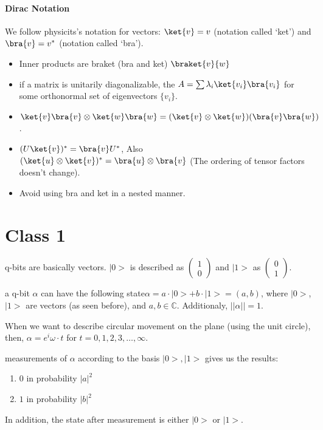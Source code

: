 \paragraph{Dirac Notation}
We follow physicits's notation for vectors: $\ket{v}=v$ (notation called `ket') and $\bra{v} = v^*$ (notation called `bra').

\begin{itemize}
    \item Inner products are braket (bra and ket)  $\braket{v}{w}$
    \item if a matrix is unitarily diagonalizable, the $A=\sum \lambda_i \ket{v_i}\bra{v_i}$ for some orthonormal set of eigenvectors $\{v_i\}$.
    \item $\ket{v}\bra{v}\otimes \ket{w}\bra{w}=(\ket{v}\otimes\ket{w})(\bra{v}\bra{w})$.
    \item $(U\ket{v})^*=\bra{v}U^*$, Also $(\ket{u}\otimes \ket{v})^*=\bra{u}\otimes \bra{v}$ (The ordering of tensor factors doesn't change).
    \item Avoid using bra and ket in a nested manner.
\end{itemize}

\section{Class 1}

q-bits are basically vectors. $|0>$ is described as $\begin{pmatrix} 1 \\ 0 \end{pmatrix}$ and $|1>$ as $\begin{pmatrix} 0 \\ 1 \end{pmatrix}$.

a q-bit $\alpha$ can have the following state$\alpha= a\cdot |0>+b\cdot |1>=(a,b)$, where $|0>$,$|1>$ are vectors (as seen before), and $a,b\in \mathbb{C}$. Additionaly, $||\alpha||=1$.

When we want to describe circular movement on the plane (using the unit circle), then, $\alpha=e^i\omega \cdot t$ for $t=0,1,2,3,\dots,\infty$.

measurements of $\alpha$ according to the basis $|0>,|1>$ gives us the results:
\begin{enumerate}
    \item $0$ in probability $|a|^2$
    \item $1$ in probability $|b|^2$
\end{enumerate}
In addition, the state after measurement is either $|0>$ or $|1>$.

